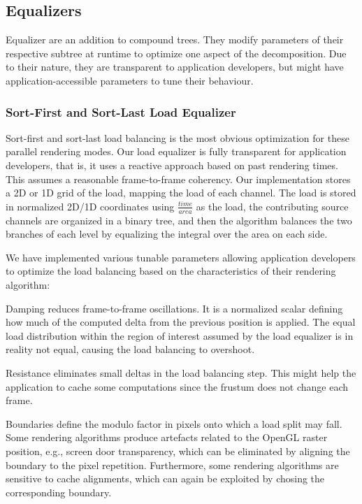 \documentclass[journal]{vgtc}                %
\begin{document}
\subsection{Equalizers}

Equalizer are an addition to compound trees. They modify parameters of their
respective subtree at runtime to optimize one aspect of the decomposition. Due
to their nature, they are transparent to application developers, but might have
application-accessible parameters to tune their behaviour.

\subsubsection{Sort-First and Sort-Last Load Equalizer}

Sort-first and sort-last load balancing is the most obvious optimization for
these parallel rendering modes. Our load equalizer is fully transparent for
application developers, that is, it uses a reactive approach based on past
rendering times. This assumes a reasonable frame-to-frame coherency. Our
implementation stores a 2D or 1D grid of the load, mapping the load of each
channel. The load is stored in normalized 2D/1D coordinates using
$\frac{time}{area}$ as the load, the contributing source channels are organized
in a binary tree, and then the algorithm balances the two branches of each level
by equalizing the integral over the area on each side.

We have implemented various tunable parameters allowing application developers
to optimize the load balancing based on the characteristics of their rendering
algorithm:
\begin{compactdesc}
\item[Damping] reduces frame-to-frame oscillations. It is a normalized scalar
  defining how much of the computed delta from the previous position is
  applied. The equal load distribution within the region of interest assumed by
  the load equalizer is in reality not equal, causing the load balancing to
  overshoot.
\item[Resistance] eliminates small deltas in the load balancing step. This might
  help the application to cache some computations since the frustum does not
  change each frame.
\item[Boundaries] define the modulo factor in pixels onto which a load split may
  fall. Some rendering algorithms produce artefacts related to the OpenGL raster
  position, e.g., screen door transparency, which can be eliminated by aligning
  the boundary to the pixel repetition. Furthermore, some rendering algorithms
  are sensitive to cache alignments, which can again be exploited by chosing the
  corresponding boundary.
\end{compactdesc}
\end{document}
